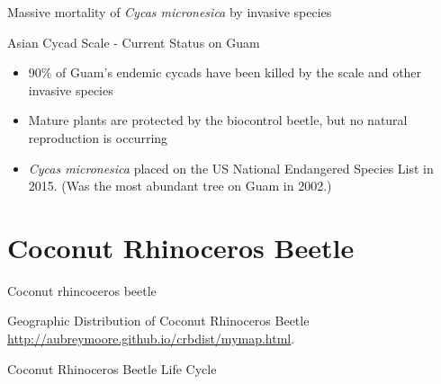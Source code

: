 \documentclass[]{beamer}
\begin{document}
\begin{frame}{51}
\end{frame}

\begin{frame}{Massive mortality of \textit{Cycas micronesica} by invasive species}
\end{frame}

\begin{frame}{Asian Cycad Scale - Current Status on Guam}
	\begin{itemize}
		\item 90\% of Guam's endemic cycads have been killed by the scale and other invasive species
		\item Mature plants are protected by the biocontrol beetle, but no natural reproduction is occurring
		\item \textit{Cycas micronesica} placed on the US National Endangered Species List in 2015. (Was the most abundant tree on Guam in 2002.)
	\end{itemize}
\end{frame}

\section{Coconut Rhinoceros Beetle}

\begin{frame}{Coconut rhincoceros beetle}
\end{frame}

\begin{frame}{Geographic Distribution of Coconut Rhinoceros Beetle}
 \\
\url{http://aubreymoore.github.io/crbdist/mymap.html}.
\end{frame}

\begin{frame}{Coconut Rhinoceros Beetle Life Cycle}
\end{frame}
\end{document}
